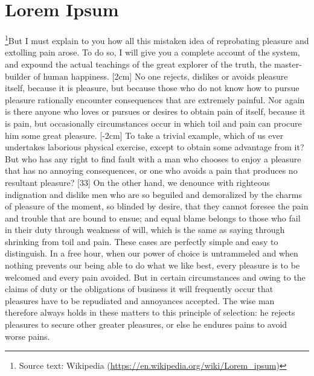 \documentclass{article}
\begin{document}
	\section{Lorem Ipsum}
	\footnote{Source text: Wikipedia (\url{https://en.wikipedia.org/wiki/Lorem_ipsum})}But I must explain to you how all this mistaken idea of reprobating pleasure and extolling pain arose. To do so, I will give you a complete account of the system, and expound the actual teachings of the great explorer of the truth, the master-builder of human happiness. [2cm] No one rejects, dislikes or avoids pleasure itself, because it is pleasure, but because those who do not know how to pursue pleasure rationally encounter consequences that are extremely painful. Nor again is there anyone who loves or pursues or desires to obtain pain of itself, because it is pain, but occasionally circumstances occur in which toil and pain can procure him some great pleasure. \reversemarginpar{}[-2cm] To take a trivial example, which of us ever undertakes laborious physical exercise, except to obtain some advantage from it? But who has any right to find fault with a man who chooses to enjoy a pleasure that has no annoying consequences, or one who avoids a pain that produces no resultant pleasure? [33] On the other hand, we denounce with righteous indignation and dislike men who are so beguiled and demoralized by the charms of pleasure of the moment, so blinded by desire, that they cannot foresee the pain and trouble that are bound to ensue; and equal blame belongs to those who fail in their duty through weakness of will, which is the same as saying through shrinking from toil and pain. These cases are perfectly simple and easy to distinguish. In a free hour, when our power of choice is untrammeled and when nothing prevents our being able to do what we like best, every pleasure is to be welcomed and every pain avoided. But in certain circumstances and owing to the claims of duty or the obligations of business it will frequently occur that pleasures have to be repudiated and annoyances accepted. The wise man therefore always holds in these matters to this principle of selection: he rejects pleasures to secure other greater pleasures, or else he endures pains to avoid worse pains.
\end{document}
